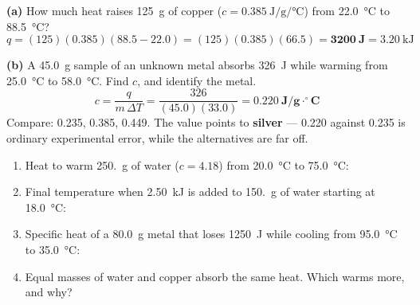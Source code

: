 \documentclass{apchem-worksheet}
\begin{document}
\begin{workedexample}
\textbf{(a)} How much heat raises \SI{125}{\gram} of copper
($c = \SI{0.385}{\joule\per\gram\per\celsius}$) from \SI{22.0}{\celsius}
to \SI{88.5}{\celsius}?
\[ q = (125)(0.385)(88.5 - 22.0) = (125)(0.385)(66.5)
     = \mathbf{3200~J} = \SI{3.20}{\kilo\joule} \]

\textbf{(b)} A \SI{45.0}{\gram} sample of an unknown metal absorbs
\SI{326}{\joule} while warming from \SI{25.0}{\celsius} to
\SI{58.0}{\celsius}. Find $c$, and identify the metal.
\[ c = \frac{q}{m\,\Delta T} = \frac{326}{(45.0)(33.0)}
     = \mathbf{0.220~J/g\cdot^\circ C} \]
Compare:  0.235,  0.385,  0.449. The value points to
\textbf{silver} --- 0.220 against 0.235 is ordinary experimental error,
while the alternatives are far off.
\end{workedexample}

\begin{yourturn}
\begin{enumerate}[leftmargin=*,itemsep=0.5em]
  \item Heat to warm \SI{250.}{\gram} of water
        ($c = 4.18$) from \SI{20.0}{\celsius} to \SI{75.0}{\celsius}:
        \workspace[1.6cm]
  \item Final temperature when \SI{2.50}{\kilo\joule} is added to
        \SI{150.}{\gram} of water starting at \SI{18.0}{\celsius}:
        \workspace[1.8cm]
  \item Specific heat of a \SI{80.0}{\gram} metal that loses
        \SI{1250}{\joule} while cooling from \SI{95.0}{\celsius} to
        \SI{35.0}{\celsius}: \workspace[1.8cm]
  \item Equal masses of water and copper absorb the same heat. Which
        warms more, and why? \workspace[1.4cm]
\end{enumerate}
\end{yourturn}
\end{document}
